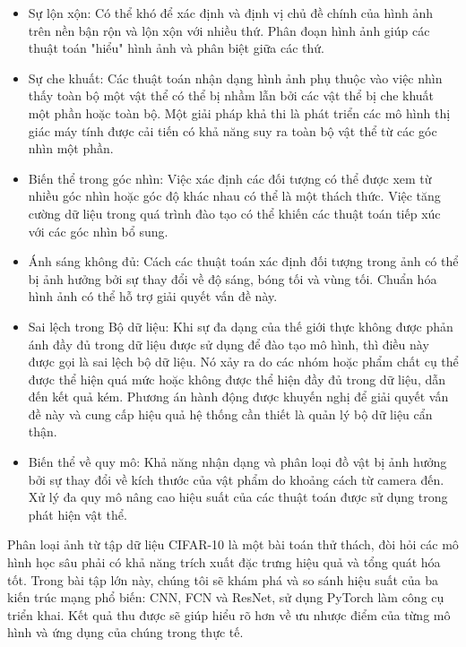 \documentclass[../main.tex]{subfiles}
\begin{document}
\begin{itemize}
    \item Sự lộn xộn: Có thể khó để xác định và định vị chủ đề chính của hình ảnh trên nền bận rộn và lộn xộn với nhiều thứ. Phân đoạn hình ảnh giúp các thuật toán "hiểu" hình ảnh và phân biệt giữa các thứ.
    \item Sự che khuất: Các thuật toán nhận dạng hình ảnh phụ thuộc vào việc nhìn thấy toàn bộ một vật thể có thể bị nhầm lẫn bởi các vật thể bị che khuất một phần hoặc toàn bộ. Một giải pháp khả thi là phát triển các mô hình thị giác máy tính được cải tiến có khả năng suy ra toàn bộ vật thể từ các góc nhìn một phần.
    \item Biến thể trong góc nhìn: Việc xác định các đối tượng có thể được xem từ nhiều góc nhìn hoặc góc độ khác nhau có thể là một thách thức. Việc tăng cường dữ liệu trong quá trình đào tạo có thể khiến các thuật toán tiếp xúc với các góc nhìn bổ sung.
    \item Ánh sáng không đủ: Cách các thuật toán xác định đối tượng trong ảnh có thể bị ảnh hưởng bởi sự thay đổi về độ sáng, bóng tối và vùng tối. Chuẩn hóa hình ảnh có thể hỗ trợ giải quyết vấn đề này.
    \item Sai lệch trong Bộ dữ liệu: Khi sự đa dạng của thế giới thực không được phản ánh đầy đủ trong dữ liệu được sử dụng để đào tạo mô hình, thì điều này được gọi là sai lệch bộ dữ liệu. Nó xảy ra do các nhóm hoặc phẩm chất cụ thể được thể hiện quá mức hoặc không được thể hiện đầy đủ trong dữ liệu, dẫn đến kết quả kém. Phương án hành động được khuyến nghị để giải quyết vấn đề này và cung cấp hiệu quả hệ thống cần thiết là quản lý bộ dữ liệu cẩn thận.
    \item Biến thể về quy mô: Khả năng nhận dạng và phân loại đồ vật bị ảnh hưởng bởi sự thay đổi về kích thước của vật phẩm do khoảng cách từ camera đến. Xử lý đa quy mô nâng cao hiệu suất của các thuật toán được sử dụng trong phát hiện vật thể.
\end{itemize}

Phân loại ảnh từ tập dữ liệu CIFAR-10 là một bài toán thử thách, đòi hỏi các mô hình học sâu phải có khả năng trích xuất đặc trưng hiệu quả và tổng quát hóa tốt. Trong bài tập lớn này, chúng tôi sẽ khám phá và so sánh hiệu suất của ba kiến trúc mạng phổ biến: CNN, FCN và ResNet, sử dụng PyTorch làm công cụ triển khai. Kết quả thu được sẽ giúp hiểu rõ hơn về ưu nhược điểm của từng mô hình và ứng dụng của chúng trong thực tế.
\end{document}
